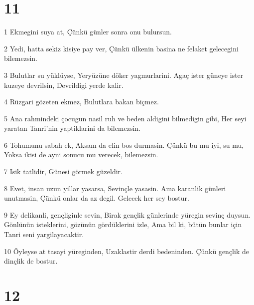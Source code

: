 \chapter{11}

\par 1 Ekmegini suya at, Çünkü günler sonra onu bulursun.
\par 2 Yedi, hatta sekiz kisiye pay ver, Çünkü ülkenin basina ne felaket gelecegini bilemezsin.
\par 3 Bulutlar su yüklüyse, Yeryüzüne döker yagmurlarini. Agaç ister güneye ister kuzeye devrilsin, Devrildigi yerde kalir.
\par 4 Rüzgari gözeten ekmez, Bulutlara bakan biçmez.
\par 5 Ana rahmindeki çocugun nasil ruh ve beden aldigini bilmedigin gibi, Her seyi yaratan Tanri'nin yaptiklarini da bilemezsin.
\par 6 Tohumunu sabah ek, Aksam da elin bos durmasin. Çünkü bu mu iyi, su mu, Yoksa ikisi de ayni sonucu mu verecek, bilemezsin.
\par 7 Isik tatlidir, Günesi görmek güzeldir.
\par 8 Evet, insan uzun yillar yasarsa, Sevinçle yasasin. Ama karanlik günleri unutmasin, Çünkü onlar da az degil. Gelecek her sey bostur.
\par 9 Ey delikanli, gençliginle sevin, Birak gençlik günlerinde yüregin sevinç duysun. Gönlünün isteklerini, gözünün gördüklerini izle, Ama bil ki, bütün bunlar için Tanri seni yargilayacaktir.
\par 10 Öyleyse at tasayi yüreginden, Uzaklastir derdi bedeninden. Çünkü gençlik de dinçlik de bostur.

\chapter{12}


